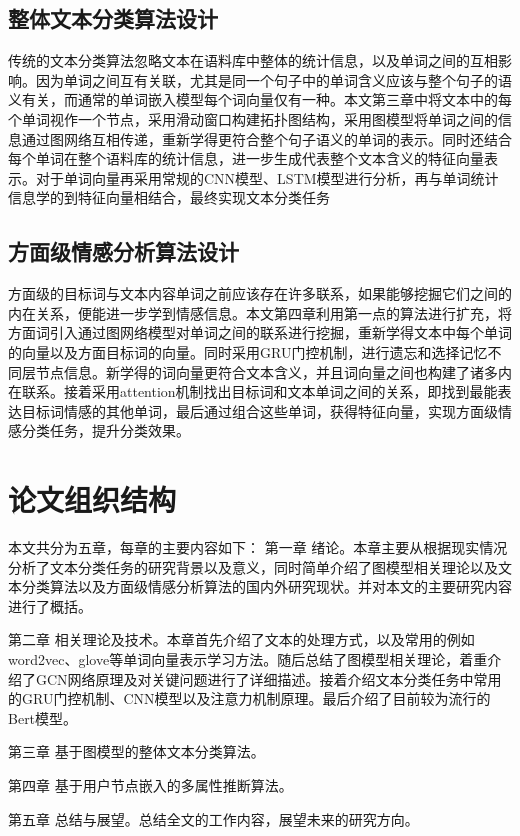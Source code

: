 \subsection{整体文本分类算法设计}
传统的文本分类算法忽略文本在语料库中整体的统计信息，以及单词之间的互相影响。因为单词之间互有关联，尤其是同一个句子中的单词含义应该与整个句子的语义有关，而通常的单词嵌入模型每个词向量仅有一种。本文第三章中将文本中的每个单词视作一个节点，采用滑动窗口构建拓扑图结构，采用图模型将单词之间的信息通过图网络互相传递，重新学得更符合整个句子语义的单词的表示。同时还结合每个单词在整个语料库的统计信息，进一步生成代表整个文本含义的特征向量表示。对于单词向量再采用常规的CNN模型、LSTM模型进行分析，再与单词统计信息学的到特征向量相结合，最终实现文本分类任务
\subsection{方面级情感分析算法设计}
方面级的目标词与文本内容单词之前应该存在许多联系，如果能够挖掘它们之间的内在关系，便能进一步学到情感信息。本文第四章利用第一点的算法进行扩充，将方面词引入通过图网络模型对单词之间的联系进行挖掘，重新学得文本中每个单词的向量以及方面目标词的向量。同时采用GRU门控机制，进行遗忘和选择记忆不同层节点信息。新学得的词向量更符合文本含义，并且词向量之间也构建了诸多内在联系。接着采用attention机制找出目标词和文本单词之间的关系，即找到最能表达目标词情感的其他单词，最后通过组合这些单词，获得特征向量，实现方面级情感分类任务，提升分类效果。
\section{论文组织结构}
本文共分为五章，每章的主要内容如下：
第一章 绪论。本章主要从根据现实情况分析了文本分类任务的研究背景以及意义，同时简单介绍了图模型相关理论以及文本分类算法以及方面级情感分析算法的国内外研究现状。并对本文的主要研究内容进行了概括。

第二章 相关理论及技术。本章首先介绍了文本的处理方式，以及常用的例如word2vec、glove等单词向量表示学习方法。随后总结了图模型相关理论，着重介绍了GCN网络原理及对关键问题进行了详细描述。接着介绍文本分类任务中常用的GRU门控机制、CNN模型以及注意力机制原理。最后介绍了目前较为流行的Bert模型。

第三章 基于图模型的整体文本分类算法。

第四章 基于用户节点嵌入的多属性推断算法。

第五章 总结与展望。总结全文的工作内容，展望未来的研究方向。 
